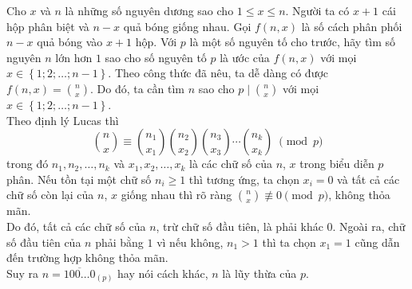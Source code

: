 \begin{bt}%
 Cho $x$ và $n$ là những số nguyên dương sao cho $1\le x\le n$. Người ta có $x+1$ cái hộp phân biệt và $n-x$ quả bóng giống nhau. Gọi $f\left( n,x\right)$ là số cách phân phối $n-x$ quả bóng vào $x+1$ hộp. Với $p$ là một số nguyên tố cho trước, hãy tìm số nguyên $n$ lớn hơn $1$ sao cho số nguyên tố $p$ là ước của $f \left( n,x\right)$ với mọi $x\in \left\{ 1;2;\ldots ;n-1 \right\}$.
 \loigiai
 {
 Theo công thức đã nêu, ta dễ dàng có được $f \left( n,x \right)=\displaystyle {n \choose x}$. Do đó, ta cần tìm $n$ sao cho $p \mid \displaystyle {n \choose x}$ với mọi $x\in \left\{ 1;2;\ldots ;n-1 \right\}$.\\
 Theo định lý Lucas thì 
 \[{n \choose x}\equiv {n_1 \choose x_1}{n_2 \choose x_2}{n_3 \choose x_3}\cdots {n_k \choose x_k} \; \pmod{p}\]
 trong đó $n_1,n_2,\ldots ,n_k$ và $x_1,x_2,\ldots ,x_k$ là các chữ số của $n$, $x$ trong biểu diễn $p$ phân. Nếu tồn tại một chữ số $n_i \ge 1$ thì tương ứng, ta chọn $x_i=0$ và tất cả các chữ số còn lại của $n$, $x$ giống nhau thì rõ ràng $\displaystyle {n \choose x} \not\equiv 0 \pmod{p}$, không thỏa mãn.\\
 Do đó, tất cả các chữ số của $n$, trừ chữ số đầu tiên, là phải khác $0$. Ngoài ra, chữ số đầu tiên của $n$ phải bằng $1$ vì nếu không, $n_1>1$ thì ta chọn $x_1=1$ cũng dẫn đến trường hợp không thỏa mãn.\\
 Suy ra $n=\overline{100\ldots 0}_{( p )}$ hay nói cách khác, $n$ là lũy thừa của $p$.
 }
\end{bt}

